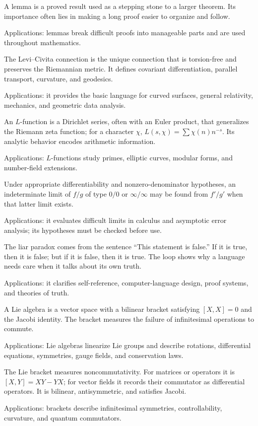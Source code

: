 A lemma is a proved result used as a stepping stone to a larger theorem. Its importance often lies in making a long proof easier to organize and follow. \par\noindent Applications: lemmas break difficult proofs into manageable parts and are used throughout mathematics.

The Levi--Civita connection is the unique connection that is torsion-free and preserves the Riemannian metric. It defines covariant differentiation, parallel transport, curvature, and geodesics. \par\noindent Applications: it provides the basic language for curved surfaces, general relativity, mechanics, and geometric data analysis.

An $L$-function is a Dirichlet series, often with an Euler product, that generalizes the Riemann zeta function; for a character $\chi$, $L(s,\chi)=\sum\chi(n)n^{-s}$. Its analytic behavior encodes arithmetic information. \par\noindent Applications: $L$-functions study primes, elliptic curves, modular forms, and number-field extensions.

Under appropriate differentiability and nonzero-denominator hypotheses, an indeterminate limit of $f/g$ of type $0/0$ or $\infty/\infty$ may be found from $f'/g'$ when that latter limit exists. \par\noindent Applications: it evaluates difficult limits in calculus and asymptotic error analysis; its hypotheses must be checked before use.

The liar paradox comes from the sentence “This statement is false.” If it is true, then it is false; but if it is false, then it is true. The loop shows why a language needs care when it talks about its own truth. \par\noindent Applications: it clarifies self-reference, computer-language design, proof systems, and theories of truth.

A Lie algebra is a vector space with a bilinear bracket satisfying $[X,X]=0$ and the Jacobi identity. The bracket measures the failure of infinitesimal operations to commute. \par\noindent Applications: Lie algebras linearize Lie groups and describe rotations, differential equations, symmetries, gauge fields, and conservation laws.

The Lie bracket measures noncommutativity. For matrices or operators it is $[X,Y]=XY-YX$; for vector fields it records their commutator as differential operators. It is bilinear, antisymmetric, and satisfies Jacobi. \par\noindent Applications: brackets describe infinitesimal symmetries, controllability, curvature, and quantum commutators.

